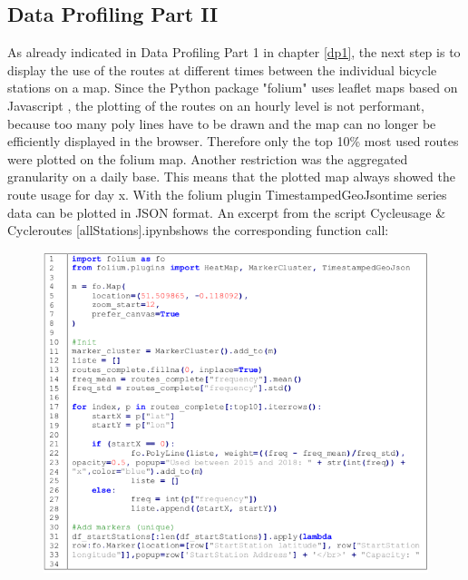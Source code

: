 \subsection{Data Profiling Part II}\label{dp2}
As already indicated in Data Profiling Part 1 in chapter \ref{dp1}, the next step is to display the use of the routes at
different times between the individual bicycle stations on a map. Since the Python package
"folium" uses leaflet maps based on Javascript \cite{RN5}, the plotting of the routes on an hourly level is
not performant, because too many poly lines have to be drawn and the map can no longer be
efficiently displayed in the browser. Therefore only the top 10\% most used routes were plotted on
the folium map. Another restriction was the aggregated granularity on a daily base. This means
that the plotted map always showed the route usage for day x. With the folium plugin
\glqq TimestampedGeoJson\grqq time series data can be plotted in JSON format. An excerpt from the
script \glqq Cycleusage \& Cycleroutes [allStations].ipynb\grqq shows the corresponding function call:
\begin{figure}[H]
\hspace{-1.6cm}
\includegraphics[width=1.2\textwidth]{img/listing1}\label{fig:listing1}
\end{figure}
